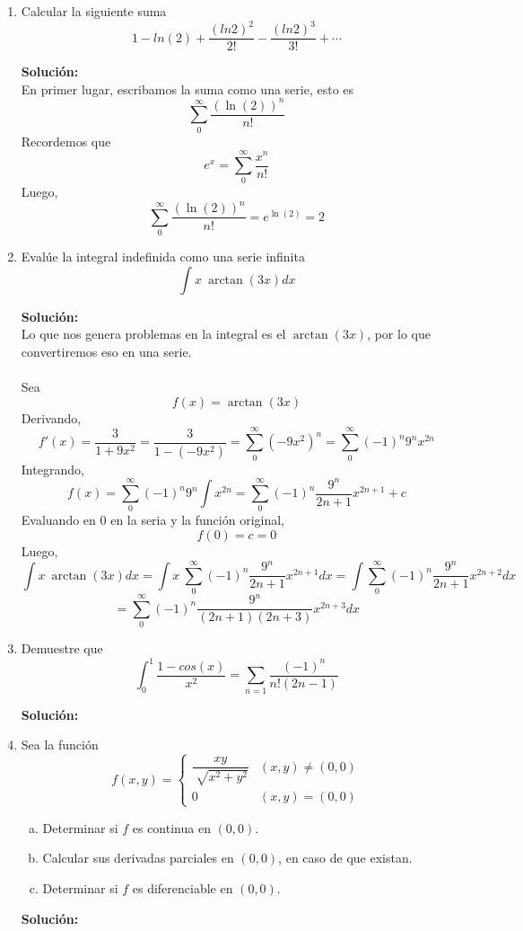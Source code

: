 \documentclass[12pt]{article}
\newenvironment{solucion}
{\begin{mdframed}[backgroundcolor=black!10]
		{\bf Solución:}\\
	}
	{
	\end{mdframed}
}
\newenvironment{preguntas}
{\begin{enumerate}\itemsep12pt
	}
	{
	\end{enumerate}
}
\begin{document}
\begin{preguntas}
\item Calcular la siguiente suma
	$$1 - ln(2) + \dfrac{(ln2)^2}{2!}-\dfrac{(ln2)^3}{3!}+\cdots$$
\begin{solucion}
En primer lugar, escribamos la suma como una serie, esto es
$$\sum\limits_{0}^{\infty} \dfrac{(\ln(2))^n}{n!}$$
Recordemos que
$$e^x = \sum\limits_{0}^{\infty} \dfrac{x^n}{n!}$$
Luego,
$$\sum\limits_{0}^{\infty} \dfrac{(\ln(2))^n}{n!} = e^{\ln(2)} = 2$$
\end{solucion}
\item Evalúe la integral indefinida como una serie infinita
	$$\int x\ \arctan(3x)dx$$
\begin{solucion}
Lo que nos genera problemas en la integral es el $\arctan(3x)$, por lo que convertiremos eso en una serie.\\
\\
Sea
$$f(x) = \arctan(3x)$$
Derivando,
$$f'(x) = \dfrac{3}{1+9x^2} = \dfrac{3}{1-(-9x^2)} = \sum\limits_0^{\infty}(-9x^2)^n = \sum\limits_0^{\infty}(-1)^n 9^n x^{2n}$$
Integrando,
$$f(x) = \sum\limits_0^{\infty}(-1)^n 9^n \int x^{2n} = \sum\limits_0^{\infty}(-1)^n \dfrac{9^n}{2n+1}x^{2n+1} + c$$
Evaluando en 0 en la seria y la función original,
$$f(0) = c = 0$$
Luego,
$$\int x\ \arctan(3x)dx
= \int x\ \sum\limits_0^{\infty}(-1)^n \dfrac{9^n}{2n+1}x^{2n+1}dx
= \int \sum\limits_0^{\infty}(-1)^n \dfrac{9^n}{2n+1}x^{2n+2}dx
$$
$$
= \sum\limits_0^{\infty}(-1)^n \dfrac{9^n}{(2n+1)(2n+3)}x^{2n+3}dx
$$
\end{solucion}
\item Demuestre que
$$\int_0^1 \dfrac{1-cos(x)}{x^2} = \sum\limits_{n=1} \dfrac{(-1)^n}{n!(2n-1)} $$
\begin{solucion}

\end{solucion}
\item Sea la función
	$$f(x,y)=
	\begin{cases}
	\dfrac{xy}{\sqrt[]{x^2+y^2}} & (x,y) \neq (0,0)\\
	0 & (x,y)=(0,0)
	\end{cases}
	$$
\begin{enumerate}[a)]
\item Determinar si $f$ es continua en $(0,0)$.
\item Calcular sus derivadas parciales en $(0,0)$, en caso de que existan.
\item Determinar si $f$ es diferenciable en $(0,0)$.
\end{enumerate}
\begin{solucion}


\end{solucion}
\end{preguntas}
\end{document}
